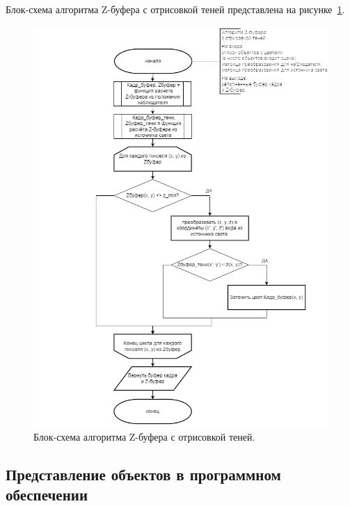 Блок-схема алгоритма Z-буфера с отрисовкой теней представлена на рисунке~\ref{fig:block_Zbuff_shadow}.

\begin{figure}[H]
    \centering
    \includegraphics[width=1\textwidth]{img/block_2.png}
    \caption{Блок-схема алгоритма Z-буфера с отрисовкой теней.}
    \label{fig:block_Zbuff_shadow}
\end{figure}



\subsection{Представление объектов в программном обеспечении}


